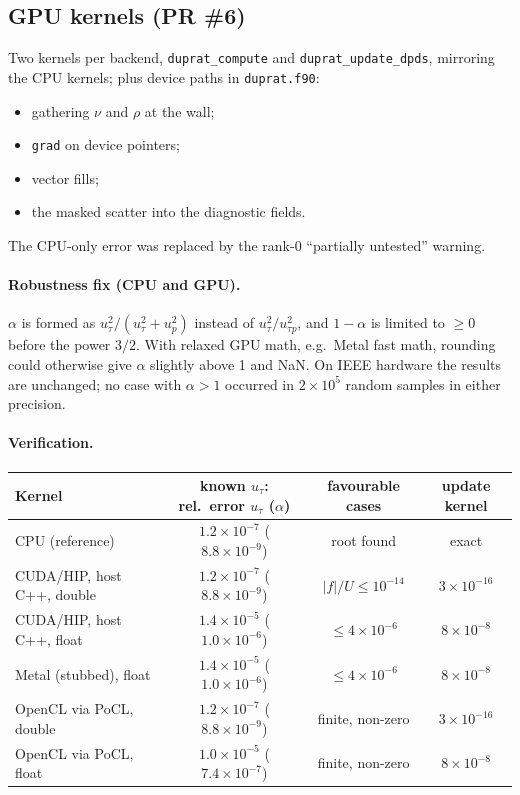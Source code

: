 \documentclass[11pt,a4paper]{article}
\newcommand{\code}[1]{\texttt{#1}}
\newcommand{\up}{u_p}
\newcommand{\utau}{u_\tau}
\newcommand{\utp}{u_{\tau p}}
\begin{document}
\subsection{GPU kernels (PR \#6)}

Two kernels per backend, \code{duprat\_compute} and
\code{duprat\_update\_dpds}, mirroring the CPU kernels; plus device paths
in \code{duprat.f90}:
\begin{itemize}
  \item gathering $\nu$ and $\rho$ at the wall;
  \item \code{grad} on device pointers;
  \item vector fills;
  \item the masked scatter into the diagnostic fields.
\end{itemize}
The CPU-only error was replaced by the rank-0 ``partially untested''
warning.

\paragraph{Robustness fix (CPU and GPU).} $\alpha$ is formed as
$\utau^2/(\utau^2+\up^2)$ instead of $\utau^2/\utp^2$, and $1-\alpha$ is
limited to $\ge0$ before the power $3/2$. With relaxed GPU math, e.g.\
Metal fast math, rounding could otherwise give $\alpha$ slightly above 1
and NaN. On IEEE hardware the results are unchanged; no case with
$\alpha > 1$ occurred in $2\times10^5$ random samples in either precision.

\paragraph{Verification.}
\begin{center}
\small
\begin{tabular}{lccc}
\toprule
Kernel & known $\utau$: rel.\ error $\utau$ ($\alpha$) & favourable cases & update kernel \\
\midrule
CPU (reference) & $1.2\times10^{-7}$ ($8.8\times10^{-9}$) & root found & exact \\
CUDA/HIP, host C++, double & $1.2\times10^{-7}$ ($8.8\times10^{-9}$) & $|f|/U\le10^{-14}$ & $3\times10^{-16}$ \\
CUDA/HIP, host C++, float & $1.4\times10^{-5}$ ($1.0\times10^{-6}$) & $\le4\times10^{-6}$ & $8\times10^{-8}$ \\
Metal (stubbed), float & $1.4\times10^{-5}$ ($1.0\times10^{-6}$) & $\le4\times10^{-6}$ & $8\times10^{-8}$ \\
OpenCL via PoCL, double & $1.2\times10^{-7}$ ($8.8\times10^{-9}$) & finite, non-zero & $3\times10^{-16}$ \\
OpenCL via PoCL, float & $1.0\times10^{-5}$ ($7.4\times10^{-7}$) & finite, non-zero & $8\times10^{-8}$ \\
\bottomrule
\end{tabular}
\end{center}
\end{document}

